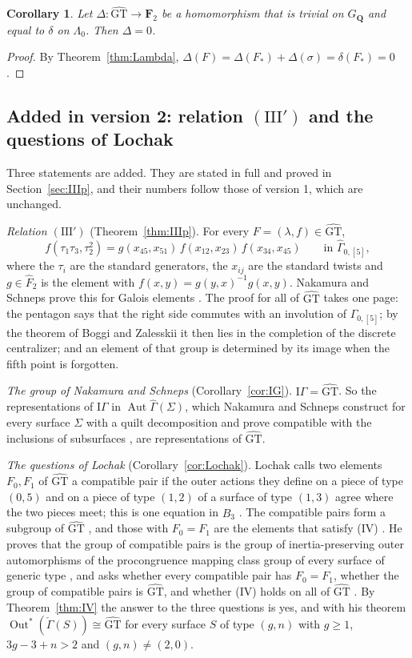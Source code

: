 \documentclass[11pt,a4paper]{article}
\theoremstyle{plain}
\newtheorem{corollary}[theorem]{Corollary}
\theoremstyle{definition}
\theoremstyle{remark}
\newcommand{\GT}{\widehat{\mathrm{GT}}}
\newcommand{\F}{\mathbf F}
\newcommand{\GQ}{G_{\mathbf Q}}
\newcommand{\Fh}{\widehat F}
\newcommand{\Bh}{\widehat B}
\newcommand{\Gh}{\widehat\Gamma}
\newcommand{\Aut}{\operatorname{Aut}}
\newcommand{\Out}{\operatorname{Out}}
\begin{document}
\begin{corollary}\label{cor:Delta}
Let $\Delta:\GT\to\F_2$ be a homomorphism that is trivial on $\GQ$ and equal to $\delta$ on $\Lambda_0$. Then
$\Delta=0$.
\end{corollary}

\begin{proof}
By Theorem~\ref{thm:Lambda}, $\Delta(F)=\Delta(F_*)+\Delta(\sigma)=\delta(F_*)=0$.
\end{proof}

\subsection*{Added in version 2: relation $(\mathrm{III}')$ and the questions of Lochak}
Three statements are added. They are stated in full and proved in Section~\ref{sec:IIIp}, and their numbers follow
those of version 1, which are unchanged.

\emph{Relation $(\mathrm{III}')$} (Theorem~\ref{thm:IIIp}). For every $F=(\lambda,f)\in\GT$,
\[
 f(\tau_1\tau_3,\tau_2^2)=g(x_{45},x_{51})\,f(x_{12},x_{23})\,f(x_{34},x_{45})\qquad\text{in }\Gh_{0,[5]},
\]
where the $\tau_i$ are the standard generators, the $x_{ij}$ are the standard twists and $g\in\Fh_2$ is the element
with $f(x,y)=g(y,x)^{-1}g(x,y)$. Nakamura and Schneps prove this for Galois elements \cite[Theorem 1.1]{NS}. The
proof for all of $\GT$ takes one page: the pentagon says that the right side commutes with an involution of
$\Gh_{0,[5]}$; by the theorem of Boggi and Zalesskii it then lies in the completion of the discrete centralizer; and
an element of that group is determined by its image when the fifth point is forgotten.

\emph{The group of Nakamura and Schneps} (Corollary~\ref{cor:IG}). $\mathrm{I}\Gamma=\GT$. So the representations
of $\mathrm{I}\Gamma$ in $\Aut\Gh(\Sigma)$, which Nakamura and Schneps construct for every surface $\Sigma$ with a
quilt decomposition and prove compatible with the inclusions of subsurfaces \cite[Theorems 1.3 and 1.4]{NS}, are
representations of $\GT$.

\emph{The questions of Lochak} (Corollary~\ref{cor:Lochak}). Lochak calls two elements $F_0,F_1$ of $\GT$ a
compatible pair if the outer actions they define on a piece of type $(0,5)$ and on a piece of type $(1,2)$ of a
surface of type $(1,3)$ agree where the two pieces meet; this is one equation in $\Bh_3$
\cite[Definition 5.4]{Lo}. The compatible pairs form a subgroup of $\GT$ \cite[Proposition--Definition 5.6]{Lo},
and those with $F_0=F_1$ are the elements that satisfy (IV) \cite[pp.~58 and 60]{Lo}. He proves that the group of
compatible pairs is the group of inertia-preserving outer automorphisms of the procongruence mapping class group of
every surface of generic type \cite[Theorem 5.10]{Lo}, and asks whether every compatible pair has $F_0=F_1$, whether
the group of compatible pairs is $\GT$, and whether (IV) holds on all of $\GT$ \cite[p.~62]{Lo}. By
Theorem~\ref{thm:IV} the answer to the three questions is yes, and with his theorem
$\Out^*(\check\Gamma(S))\cong\GT$ for every surface $S$ of type $(g,n)$ with $g\ge1$, $3g-3+n>2$ and
$(g,n)\ne(2,0)$.
\end{document}

